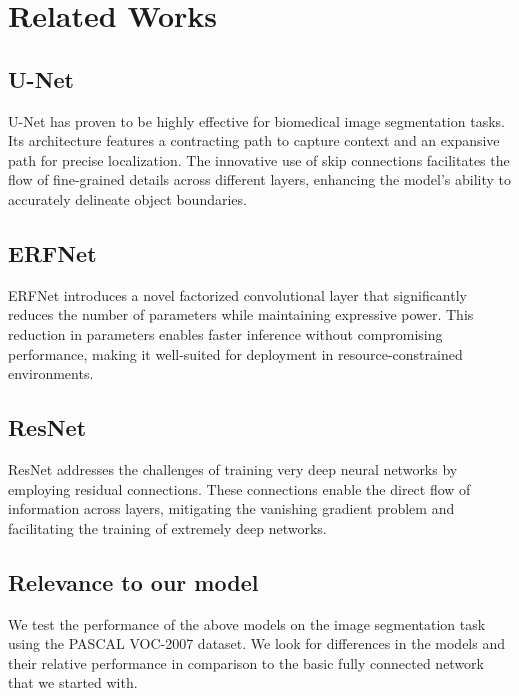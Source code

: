 \section*{Related Works}

\subsection*{U-Net}
U-Net \cite{unet} has proven to be highly effective for biomedical image segmentation tasks. Its architecture features a contracting path to capture context and an expansive path for precise localization. The innovative use of skip connections facilitates the flow of fine-grained details across different layers, enhancing the model's ability to accurately delineate object boundaries.

\subsection*{ERFNet}
ERFNet \cite{erfnet} introduces a novel factorized convolutional layer that significantly reduces the number of parameters while maintaining expressive power. This reduction in parameters enables faster inference without compromising performance, making it well-suited for deployment in resource-constrained environments.

\subsection*{ResNet}
ResNet \cite{resnet} addresses the challenges of training very deep neural networks by employing residual connections. These connections enable the direct flow of information across layers, mitigating the vanishing gradient problem and facilitating the training of extremely deep networks.

\subsection*{Relevance to our model}
We test the performance of the above models on the image segmentation task using the PASCAL VOC-2007 dataset. We look for differences in the models and their relative performance in comparison to the basic fully connected network that we started with.


